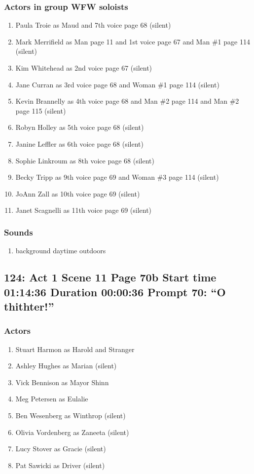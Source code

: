 \subsubsection{Actors in group WFW soloists}
\begin{enumerate}
\item Paula Troie as Maud and 7th voice page 68 (silent)
\item Mark Merrifield as Man page 11 and 1st voice page 67 and Man \#1 page 114 (silent)
\item Kim Whitehead as 2nd voice page 67 (silent)
\item Jane Curran as 3rd voice page 68 and Woman \#1 page 114 (silent)
\item Kevin Brannelly as 4th voice page 68 and Man \#2 page 114 and Man \#2 page 115 (silent)
\item Robyn Holley as 5th voice page 68 (silent)
\item Janine Leffler as 6th voice page 68 (silent)
\item Sophie Linkroum as 8th voice page 68 (silent)
\item Becky Tripp as 9th voice page 69 and Woman \#3 page 114 (silent)
\item JoAnn Zall as 10th voice page 69 (silent)
\item Janet Scagnelli as 11th voice page 69 (silent)
\end{enumerate}

\subsubsection{Sounds}
\begin{enumerate}
\item background daytime outdoors
\end{enumerate}
\subsection{124: Act 1 Scene 11 Page 70b Start time 01:14:36 Duration 00:00:36 Prompt 70: ``O thithter!''}

\subsubsection{Actors}
\begin{enumerate}
\item Stuart Harmon as Harold and Stranger
\item Ashley Hughes as Marian (silent)
\item Vick Bennison as Mayor Shinn
\item Meg Petersen as Eulalie
\item Ben Wesenberg as Winthrop (silent)
\item Olivia Vordenberg as Zaneeta (silent)
\item Lucy Stover as Gracie (silent)
\item Pat Sawicki as Driver (silent)
\end{enumerate}
